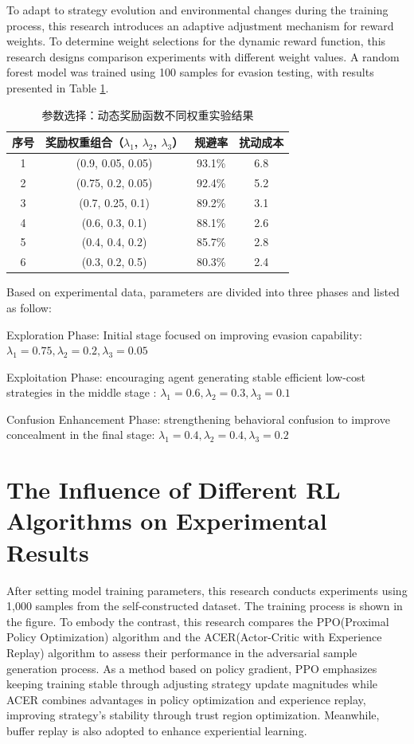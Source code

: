 To adapt to strategy evolution and environmental changes during the training process, this research introduces an adaptive adjustment mechanism for reward weights. To determine weight selections for the dynamic reward function, this research designs comparison experiments with different weight values. A random forest model was trained using 100 samples for evasion testing, with results presented in Table \ref{tab:5.8}.

\renewcommand{\arraystretch}{1.3}
\begin{table}[htbp]
	\centering
	\caption{参数选择：动态奖励函数不同权重实验结果}
	\label{tab:5.8}
	\begin{tabular*}{0.9\textwidth}{@{\extracolsep{\fill}}cccc}
		\toprule
		序号 & 奖励权重组合（$\lambda_1$, $\lambda_2$, $\lambda_3$） & 规避率 & 扰动成本 \\
		\midrule
		1 & (0.9, 0.05, 0.05) & 93.1\% & 6.8 \\
		2 & (0.75, 0.2, 0.05) & 92.4\% & 5.2 \\
		3 & (0.7, 0.25, 0.1) & 89.2\% & 3.1 \\
		4 & (0.6, 0.3, 0.1) & 88.1\% & 2.6 \\
		5 & (0.4, 0.4, 0.2) & 85.7\% & 2.8 \\
		6 & (0.3, 0.2, 0.5) & 80.3\% & 2.4 \\
		\bottomrule
	\end{tabular*}
\end{table}

Based on experimental data, parameters are divided into three phases and listed as follow:

Exploration Phase: Initial stage focused on improving evasion capability:$\lambda_1= 0.75, \lambda_2 = 0.2, \lambda_3=0.05$

Exploitation Phase: encouraging agent generating stable efficient low-cost strategies in the middle stage :
$\lambda_1= 0.6, \lambda_2 = 0.3, \lambda_3=0.1$

Confusion Enhancement Phase:  strengthening behavioral confusion to improve concealment in the final stage:
$\lambda_1= 0.4, \lambda_2 = 0.4, \lambda_3=0.2$

\section{The Influence of Different RL Algorithms on Experimental Results}

After setting model training parameters, this research conducts experiments using 1,000 samples from the self-constructed dataset. The training process is shown in the figure. To embody the contrast, this research compares the PPO(Proximal Policy Optimization) algorithm and the ACER(Actor-Critic with Experience Replay)\cite{wang2016sample} algorithm to assess their performance in the adversarial sample generation process. As a method based on policy gradient, PPO emphasizes keeping training stable through adjusting strategy update magnitudes while ACER combines advantages in policy optimization and experience replay, improving strategy's stability through trust region optimization. Meanwhile, buffer replay is also adopted to enhance experiential learning.

